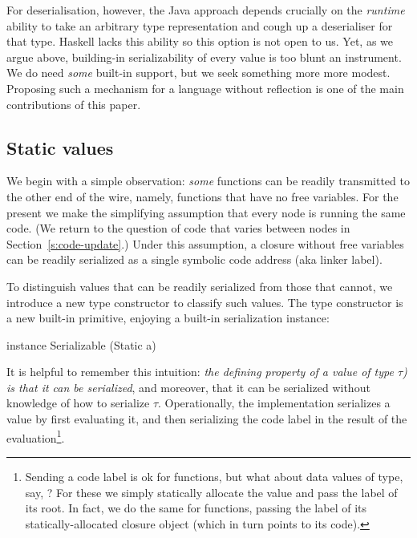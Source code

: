 \documentclass[preprint]{sigplanconf}
\begin{document}
For deserialisation, however, the Java approach depends crucially on the \emph{runtime} ability
to take an arbitrary type representation and cough up a deserialiser for that type.
Haskell lacks this ability so this option is not open to us.
Yet, as we argue above, building-in serializability of every value is
too blunt an instrument.  We do need \emph{some} built-in support, but
we seek something more more modest.  Proposing such a mechanism for a language without reflection is one of 
the main contributions of this paper.

\subsection{Static values}

We begin with a simple observation: \emph{some} functions can be readily
transmitted to the other end of the wire, namely, functions that have no
free variables.  For the present we make the simplifying assumption that every node is running the same code.  (We return to the question
of code that varies between nodes in Section~\ref{s:code-update}.)
Under this assumption, a closure without free variables can be
readily serialized as a single symbolic code address (aka linker label).

\lstset{mathescape=true}

To distinguish values that can be readily serialized from those that cannot, we introduce a new type constructor
 to classify such values.  The type 
constructor  is a new built-in primitive, 
enjoying a built-in serialization instance:
\begin{code}
  instance Serializable (Static a)
\end{code}
It is helpful to remember this intuition: \emph{the defining property of
a value of type \emph{ $\tau$)} is that it can be serialized},
and moreover, that it can be serialized without knowledge of how to serialize $\tau$.
Operationally, the implementation serializes a  value by first evaluating it,
and then serializing the code label in the result of the evaluation\footnote{
Sending a code label is ok for functions, but what about data values of type, say, ?
For these we simply statically allocate the  value and pass the label of its root.
In fact, we do the same for functions, passing the label of its 
statically-allocated closure object (which in turn points to its code).
}.  
\end{document}
